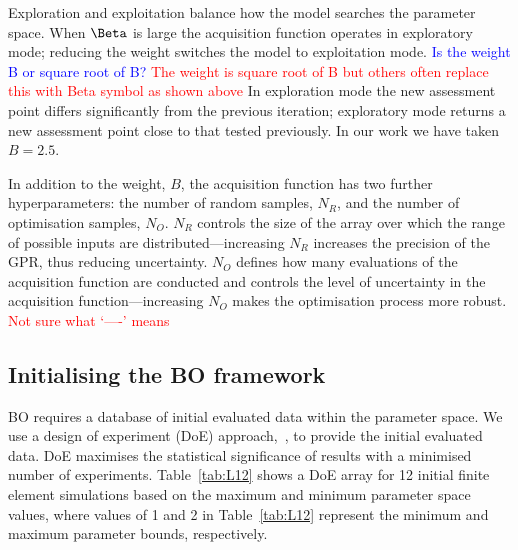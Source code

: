 \documentclass[preprint, review, 12pt]{elsarticle}
\begin{document}
{	Exploration and exploitation balance how the model searches the parameter space.
	When $\Beta$ is large the acquisition function operates in exploratory mode; reducing the weight switches the model to exploitation mode.
	\textcolor{blue}{Is the weight B or square root of B?}
	\textcolor{red}{The weight is square root of B but others often replace this with Beta symbol as shown above}
	In exploration mode the new assessment point differs significantly from the previous iteration; exploratory mode returns a new assessment point close to that tested previously.
	In our work we have taken $B=2.5$.

	In addition to the weight, $B$, the acquisition function has two further hyperparameters: the number of random samples, $N_R$, and the number of optimisation samples, $N_O$.
	$N_R$ controls the size of the array over which the range of possible inputs are distributed---increasing $N_R$ increases the precision of the GPR, thus reducing uncertainty.
	$N_O$ defines how many evaluations of the acquisition function are conducted and controls the level of uncertainty in the acquisition function---increasing $N_O$ makes the optimisation process more robust.
	\textcolor{red}{Not sure what `----' means}

	\subsection{Initialising the BO framework}
	\label{h:framework}

	BO requires a database of initial evaluated data within the parameter space.
	We use a design of experiment (DoE) approach,~\cite{UY2009, FRALEY2020}, to provide the initial evaluated data.
	DoE maximises the statistical significance of results with a minimised number of experiments.
	Table~\ref{tab:L12} shows a DoE array for 12 initial finite element simulations based on the maximum and minimum parameter space values, where values of 1 and 2 in Table~\ref{tab:L12} represent the minimum and maximum parameter bounds, respectively.

	

}
\end{document}
